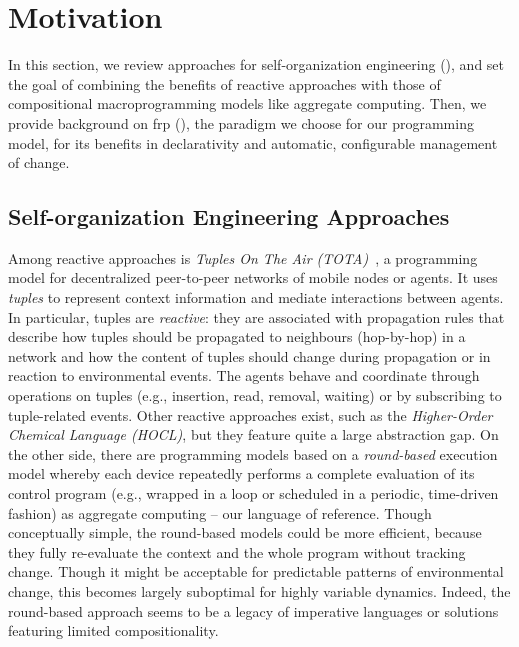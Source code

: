 \section{Motivation}\label{acsos2023-frp:sec:background}
In this section,
 we review approaches for self-organization engineering (),
 and set the goal of combining the benefits of reactive approaches
with those of compositional macroprogramming models like aggregate computing.
%
Then, we provide background on \ac{frp} (),
 the paradigm we choose for our programming model,
 for its benefits in declarativity and
 automatic, configurable management of change.

\subsection{Self-organization Engineering Approaches}
\label{acsos2023-frp:sec:background:selforg}
Among reactive approaches is \emph{Tuples On The Air (TOTA)}~\cite{tota},
 a programming model for decentralized peer-to-peer networks of mobile nodes or agents.
%
It uses \emph{tuples} to represent context information 
 and mediate interactions between agents.
%
In particular, tuples are \emph{reactive}: 
 they are associated with propagation rules that describe how tuples 
 should be propagated to neighbours (hop-by-hop) in a network and how the
 content of tuples should change during propagation
 or in reaction to environmental events. 
%
The agents behave and coordinate
 through operations on tuples (e.g., insertion, read, removal, waiting) or by subscribing to tuple-related events.
%
Other reactive approaches exist, 
 such as the \emph{Higher-Order Chemical Language (HOCL)}\cite{DBLP:journals/ijuc/BanatreFR07},
 but they feature quite a large abstraction gap.
%
On the other side, there are programming models 
 based on a \emph{round-based} execution model
 whereby 
 each device repeatedly performs a complete evaluation of its control program
 (e.g., wrapped in a loop or scheduled in a periodic, time-driven fashion) as aggregate computing -- our language of reference.
%
Though conceptually simple,
 the round-based models could be more efficient,
 because they fully re-evaluate the context
 and the whole program
 without tracking change.
%
Though it might be acceptable for predictable patterns of environmental change,
  this becomes largely suboptimal for highly variable dynamics.
%
Indeed,
 the round-based approach seems to be a legacy of imperative languages or solutions featuring limited compositionality.
